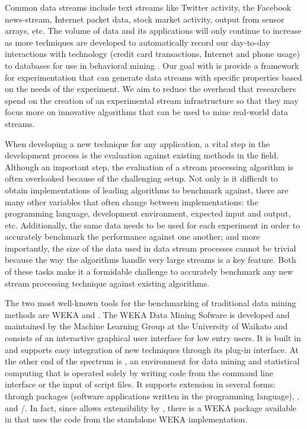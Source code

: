 \documentclass[nojss]{jss}
\begin{document}
Common data streams include text streams like Twitter activity, the Facebook news-stream, Internet packet data, stock market activity, output from sensor arrays, etc. The volume of data and its applications will only continue to increase as more techniques are developed to automatically record our day-to-day interactions with technology (credit card transactions, Internet and phone usage) to databases for use in behavioral mining \citep{stream:Aggarwal:2007}. Our goal with  is provide a framework for experimentation that can generate data streams with specific properties based on the needs of the experiment. We aim to reduce the overhead that researchers spend on the creation of an experimental stream infrastructure so that they may focus more on innovative algorithms that can be used to mine real-world data streams.


When developing a new technique for any application, a vital step in the development process is the evaluation against existing methods in the field. Although an important step, the evaluation of a stream processing algorithm is often overlooked because of the challenging setup. Not only is it difficult to obtain implementations of leading algorithms to benchmark against, there are many other variables that often change between implementations: the programming language, development environment, expected input and output, etc. Additionally, the same data needs to be used for each experiment in order to accurately benchmark the performance against one another; and more importantly, the size of the data used in data stream processes cannot be trivial because the way the algorithms handle very large streams is a key feature. Both of these tasks make it a formidable challenge to accurately benchmark any new stream processing technique against existing algorithms.


The two most well-known tools for the benchmarking of traditional data mining methods are WEKA and  \citep{stream:Hall+Frank+Holmes+Pfahringer+Reutemann+Witten:2009, stream:R:2005}. The WEKA Data Mining Sofware is developed and maintained by the Machine Learning Group at the University of Waikato and consists of an interactive graphical user interface for low entry users. It is built in  and supports easy integration of new techniques through its plug-in interface. At the other end of the spectrum is , an environment for data mining and statistical computing that is operated solely by writing code from the command line interface or the input of script files. It supports extension in several forms: through  packages (software applications written in the  programming language), , and /. In fact, since  allows extensibility by , there is a WEKA package available in  that uses the  code from the standalone WEKA implementation.
\end{document}
